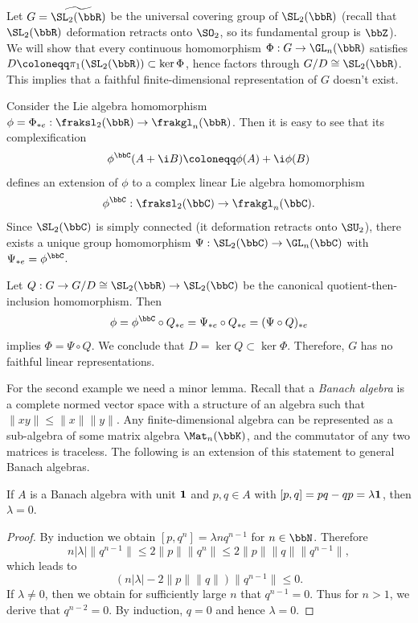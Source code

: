 \begin{example}\label{ex SL2R nonlinear}
    Let $G=\widetilde{\SL_2(\bbR)}$ be the universal covering group of $\SL_2(\bbR)$ (recall that $\SL_2(\bbR)$ deformation retracts onto $\SO_2$, so its fundamental group is $\bbZ$). We will show that every continuous homomorphism $\Phi:G\to \GL_n(\bbR)$ satisfies $D\coloneqq \pi_1(\SL_2(\bbR))\subset \ker\Phi$, hence factors through $G\slash D\cong \SL_2(\bbR)$. This implies that a faithful finite-dimensional representation of $G$ doesn't exist.

    Consider the Lie algebra homomorphism $\phi=\Phi_{\ast e}:\fraksl_2(\bbR)\to \frakgl_n(\bbR)$. Then it is easy to see that its complexification 
    \[\phi^\bbC (A+\i B)\coloneqq \phi(A)+\i \phi(B)\]
    defines an extension of $\phi$ to a complex linear Lie algebra homomorphism 
    \[\phi^\bbC:\fraksl_2(\bbC)\to \frakgl_n(\bbC).\]
    Since $\SL_2(\bbC)$ is simply connected (it deformation retracts onto $\SU_2$), there exists a unique group homomorphism $\Psi:\SL_2(\bbC)\to \GL_n(\bbC)$ with $\Psi_{\ast e}=\phi^\bbC$. 

    Let $Q:G\to G\slash D\cong \SL_2(\bbR)\to \SL_2(\bbC)$ be the canonical quotient-then-inclusion homomorphism. Then 
    \[\phi=\phi^\bbC\circ Q_{\ast e}=\Psi_{\ast e}\circ Q_{\ast e}=(\Psi\circ Q)_{\ast e}\]
    implies $\Phi=\Psi\circ Q$. We conclude that $D=\ker Q\subset \ker\Phi$. Therefore, $G$ has no faithful linear representations.
\end{example}


For the second example we need a minor lemma. Recall that a \emph{Banach algebra} is a complete normed vector space with a structure of an algebra such that $\lVert xy\rVert\leq \lVert x\rVert \lVert y\rVert$. Any finite-dimensional algebra can be represented as a sub-algebra of some matrix algebra $\Mat_n(\bbK)$, and the commutator of any two matrices is traceless. The following is an extension of this statement to general Banach algebras.

\begin{lem}
    If $A$ is a Banach algebra with unit $\bf{1}$ and $p,q\in A$ with $[p,q]=pq-qp=\lambda \bf{1}$, then $\lambda=0$.
\end{lem}
\begin{proof}
    By induction we obtain $[p,q^n]=\lambda nq^{n-1}$ for $n\in\bbN$. Therefore
    \[n|\lambda|\lVert q^{n-1}\rVert\leq 2\lVert p\rVert \lVert q^n\rVert\leq 2\lVert p\rVert \lVert q\rVert \lVert q^{n-1}\rVert,\]
    which leads to
    \[\left(n|\lambda|-2\lVert p\rVert \lVert q\rVert\right)\lVert q^{n-1}\rVert \leq 0.\]
    If $\lambda\neq 0$, then we obtain for sufficiently large $n$ that $q^{n-1}=0$. Thus for $n>1$, we derive that $q^{n-2}=0$. By induction, $q=0$ and hence $\lambda=0$.
\end{proof}


